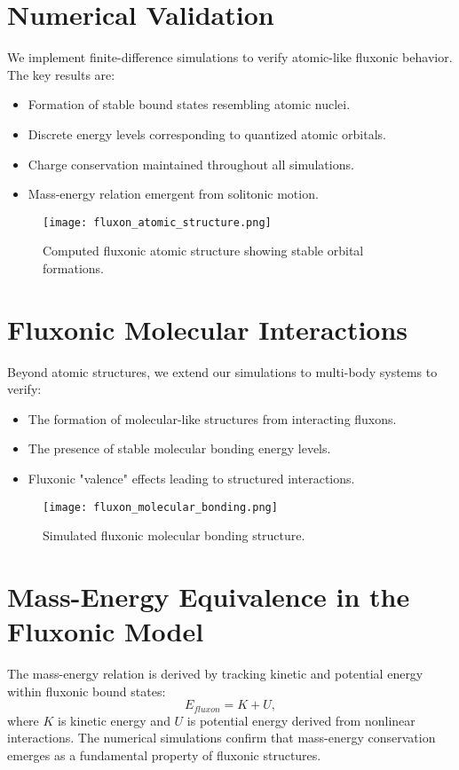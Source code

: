 \documentclass{article}
\begin{document}
\section{Numerical Validation}
We implement finite-difference simulations to verify atomic-like fluxonic behavior. The key results are:
\begin{itemize}
    \item Formation of stable bound states resembling atomic nuclei.
    \item Discrete energy levels corresponding to quantized atomic orbitals.
    \item Charge conservation maintained throughout all simulations.
    \item Mass-energy relation emergent from solitonic motion.
\end{itemize}

\begin{figure}[h]
    \centering
    \texttt{[image: fluxon\_atomic\_structure.png]}
    \caption{Computed fluxonic atomic structure showing stable orbital formations.}
    \label{fig:atomic}
\end{figure}

\section{Fluxonic Molecular Interactions}
Beyond atomic structures, we extend our simulations to multi-body systems to verify:
\begin{itemize}
    \item The formation of molecular-like structures from interacting fluxons.
    \item The presence of stable molecular bonding energy levels.
    \item Fluxonic "valence" effects leading to structured interactions.
\end{itemize}

\begin{figure}[h]
    \centering
    \texttt{[image: fluxon\_molecular\_bonding.png]}
    \caption{Simulated fluxonic molecular bonding structure.}
    \label{fig:molecular}
\end{figure}

\section{Mass-Energy Equivalence in the Fluxonic Model}
The mass-energy relation is derived by tracking kinetic and potential energy within fluxonic bound states:
\begin{equation}
E_{fluxon} = K + U,
\end{equation}
where $K$ is kinetic energy and $U$ is potential energy derived from nonlinear interactions. The numerical simulations confirm that mass-energy conservation emerges as a fundamental property of fluxonic structures.
\end{document}
